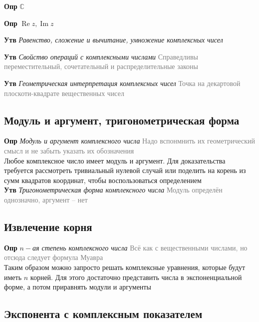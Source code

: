 \documentclass[a4paper, 14pt]{article}
\begin{document}
    \textbf{Опр} \textit{$\mathbb{C}$}

    \textbf{Опр} \textit{$\operatorname{Re}z, \operatorname{Im}z$}

    \textbf{Утв} \textit{Равенство, сложение и вычитание, умножение комплексных чисел}

    \textbf{Утв} \textit{Свойство операций с комплексными числами} \textcolor{gray}{Справедливы переместительный,
        сочетательный и распределительные законы}

    \textbf{Утв} \textit{Геометрическая интерпретация комплексных чисел} \textcolor{gray}{Точка на декартовой
    плоскоти-квадрате вещественных чисел}

    \subsection{Модуль и аргумент, тригонометрическая форма}

    \textbf{Опр} \textit{Модуль и аргумент комплексного числа} \textcolor{gray}{Надо вспонмнить их геометрический
    смысл и не забыть указать их обозначения} \\

    Любое комплексное число имеет модуль и аргумент.
    Для доказательства требуется рассмотреть тривиальный нулевой
    случай или поделить на корень из сумм квадратов координат, чтобы воспользоваться определением \\

    \textbf{Утв} \textit{Тригонометрическая форма комплексного числа} \textcolor{gray}{Модуль определён однозначно,
        аргумент -- нет}

    \subsection{Извлечение корня}

    \textbf{Опр} \textit{$n-$ая степень комплексного числа} \textcolor{gray}{Всё как с вещественными числами, но
    отсюда следует формула Муавра} \\

    Таким образом можно запросто решать комплексные уравнения, которые будут иметь $n$ корней.
    Для этого достаточно
    представить числа в экспоненциальной форме, а потом приравнять модули и аргументы

    \subsection{Экспонента с комплексным показателем}
\end{document}
